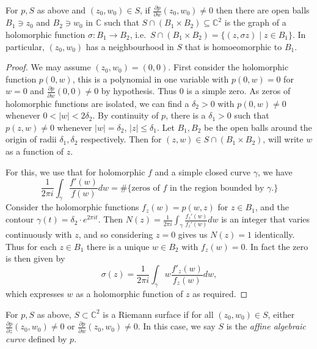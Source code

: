 \begin{theorem}
    For \(p,S\) as above and \((z_0,w_0)\in S\), if \(\frac{\partial
    p}{\partial w}(z_0,w_0)\neq 0\) then there are open balls \(B_1\ni z_0\) and
    \(B_2\ni w_0\) in \(\mathbb{C}\) such that \(S\cap (B_1\times
    B_2)\subseteq \mathbb{C}^2\) is the graph of a holomorphic function
    \(\sigma: B_1\to B_2\), i.e.\ \(S\cap (B_1\times B_2) = \{(z,\sigma
    z)\;|\; z\in B_1\}.\)
    In particular, \((z_0,w_0)\) has a neighbourhood in \(S\) that is
    homoeomorphic to \(B_1\).
    \begin{proof}
        We may assume \((z_0,w_0)=(0,0)\). First consider the holomorphic
        function \(p(0,w)\), this is a polynomial in one variable with
        \(p(0,w)=0\) for \(w=0\) and \(\frac{\partial p}{\partial w}(0,0)\neq 0\)
        by hypothesis. Thus \(0\) is a simple zero. As zeros of holomorphic
        functions are isolated, we can find a \(\delta_2 > 0\) with
        \(p(0,w)\neq 0\) whenever \(0<|w|<2\delta_2\). By continuity of \(p\),
        there is a \(\delta_1>0\) such that \(p(z,w)\neq 0\) whenever
        \(|w|=\delta_2\), \(|z|\leq \delta_1\). Let \(B_1,B_2\) be the open
        balls around the origin of radii \(\delta_1,\delta_2\) respectively.
        Then for \((z,w)\in S\cap (B_1\times B_2)\), will write \(w\) as a
        function of \(z\).

        For this, we use that for holomorphic \(f\) and a simple closed
        curve \(\gamma\), we have
        \[
            \frac{1}{2\pi i}\int_\gamma \frac{f'(w)}{f(w)}dw =
            \#\{\text{zeros of \(f\) in the region bounded by \(\gamma\).}\}
        \]
        Consider the holomorphic functions \(f_z(w)=p(w,z)\) for \(z\in B_1\),
        and the contour \(\gamma(t)=\delta_2\cdot e^{2\pi i t}\).
        Then \(N(z)=\frac{1}{2\pi i}\int_\gamma \frac{f_z'(w)}{f_z'(w)}dw\) is
        an integer that varies continuously with \(z\), and so considering
        \(z=0\) gives us \(N(z)=1\) identically. Thus for each \(z\in B_1\)
        there is a unique \(w\in B_2\) with \(f_z(w)=0\). In fact the zero is
        then given by
        \[\sigma(z)=\frac{1}{2\pi i}\int_\gamma w\frac{f'_z(w)}{f_z(w)}dw,\]
        which expresses \(w\) as a holomorphic function of \(z\) as required.
    \end{proof}
\end{theorem}

\begin{corollary}
    For \(p,S\) as above, \(S\subset \mathbb{C}^2\) is a Riemann surface if
    for all \((z_0,w_0)\in S\), either \(\frac{\partial p}{\partial
    z}(z_0,w_0)\neq 0\) or \(\frac{\partial p}{\partial
    w}(z_0,w_0)\neq 0.\) In this case, we say \(S\) is the \emph{affine
    algebraic curve} defined by \(p\).
\end{corollary}



